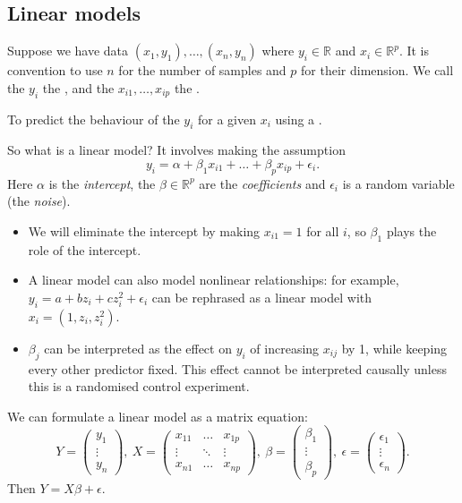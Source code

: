 \documentclass[egregdoesnotlikesansseriftitles,a4paper]{scrartcl}
\begin{document}
\subsection{Linear models}
Suppose we have data $(x_1 , y_1 ), \ldots, (x_n , y_{n})$ where $y_{i}\in \mathbb{R}$ and $x_i \in \mathbb{R}^p$. It is convention to use $n$ for the number of samples and $p$ for their dimension. We call the $y_i$ the , and the $x_{i1},\ldots, x_{ip}$ the .
\begin{goal}
     To predict the behaviour of the $y_{i}$ for a given $x_{i}$ using a .
\end{goal}
So what is a linear model? It involves making the assumption \[
y_i=\alpha+ \beta_1 x_{i1} +\ldots+ \beta_p x_{ip}+ \epsilon_i
.\] Here $\alpha$ is the \emph{intercept}, the $\beta \in \mathbb{R}^{p}$ are the \emph{coefficients} and $\epsilon_{i}$ is a random variable (the \emph{noise}).
\begin{remarks}
      \begin{itemize}
           \item We will eliminate the intercept by making $x_{i1 }=1$ for all $i$, so $\beta_1 $ plays the role of the intercept.
           \item A linear model can also model nonlinear relationships: for example, $y_{i}=a+bz_{i}+cz_{i}^2+\epsilon_{i}$ can be rephrased as a linear model with $x_{i}=(1, z_{i},z_{i}^2)$.
           \item $\beta_{j}$ can be interpreted as the effect on $y_{i}$ of increasing $x_{ij}$ by 1, while keeping every other predictor fixed. This effect cannot be interpreted causally unless this is a randomised control experiment.
      \end{itemize}
\end{remarks}
We can formulate a linear model as a matrix equation: \[
Y= \begin{pmatrix} y_1 \\ \vdots \\ y_n \end{pmatrix}, \ X = \begin{pmatrix} x_{11} &\ldots& x_{1p}\\ \vdots & \ddots & \vdots\\x_{n1} &\ldots& x_{np} \end{pmatrix}, \ \beta= \begin{pmatrix} \beta_1 \\ \vdots \\ \beta_{p} \end{pmatrix}, \ \epsilon= \begin{pmatrix} \epsilon_1 \\ \vdots \\ \epsilon_n \end{pmatrix}
.\] Then $Y=X \beta+\epsilon$.
\end{document}
